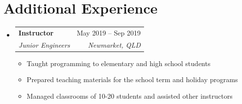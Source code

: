 \documentclass[letterpaper,11pt]{article}
\makeatletter
\newcommand{\resumeItem}[1]{
  \item\small{
    {#1 \vspace{-2pt}}
  }
}
\newcommand{\resumeSubheading}[4]{
  \vspace{-2pt}\item
    \begin{tabular*}{0.97\textwidth}[t]{l@{\extracolsep{\fill}}r}
      \textbf{#1} & #2 \\
      \textit{\small#3} & \textit{\small #4} \\
    \end{tabular*}\vspace{-7pt}
}
\newcommand{\resumeSubHeadingListStart}{\begin{itemize}[leftmargin=0.15in, label={}]}
\newcommand{\resumeSubHeadingListEnd}{\end{itemize}}
\newcommand{\resumeItemListStart}{\begin{itemize}}
\newcommand{\resumeItemListEnd}{\end{itemize}\vspace{-5pt}}
\makeatother
\begin{document}
\section{Additional Experience}
  \resumeSubHeadingListStart
    \resumeSubheading
      {Instructor}{May 2019 -- Sep 2019}
      {Junior Engineers}{Newmarket, QLD}
      \resumeItemListStart
        \resumeItem{Taught programming to elementary and high school students}
        \resumeItem{Prepared teaching materials for the school term and holiday programs}
        \resumeItem{Managed classrooms of 10-20 students and assisted other instructors}
      \resumeItemListEnd
  \resumeSubHeadingListEnd
\end{document}
